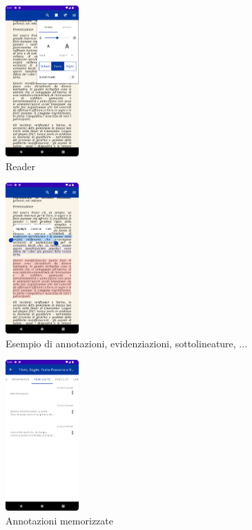 \begin{multicols}{3}
            \begin{figure}[H]
                \centering
                \includegraphics[width=0.25\textwidth]{img/reader_settings.png}
                \caption{Reader}
                \label{readersettings-android}
            \end{figure}
            
            \begin{figure}[H]
                \centering
                \includegraphics[width=0.25\textwidth]{img/annotations.png}
                \caption{Esempio di annotazioni, evidenziazioni, sottolineature, ...}
                \label{annotations-android}
            \end{figure}
            
            \begin{figure}[H]
                \centering
                \includegraphics[width=0.25\textwidth]{img/annotation2.png}
                \caption{Annotazioni memorizzate}
                \label{annotation2-android}
            \end{figure}


\end{multicols}
